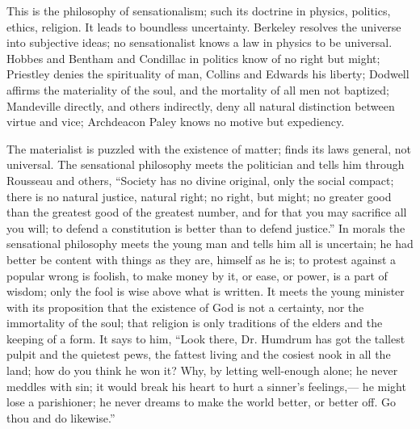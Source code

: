 \documentclass[12pt]{article}
\begin{document}

This is the philosophy of sensationalism; such its doctrine in physics, politics, ethics, religion. It leads to boundless uncertainty. Berkeley resolves the universe into subjective ideas; no sensationalist knows a law in physics to be universal. Hobbes and Bentham and Condillac in politics know of no right but might; Priestley denies the spirituality of man, Collins and Edwards his liberty; Dodwell affirms the materiality of the soul, and the mortality of all men not baptized; Mandeville directly, and others indirectly, deny all natural distinction between virtue and vice; Archdeacon Paley knows no motive but expediency. 

The materialist is puzzled with the existence of matter; finds its laws general, not universal. The sensational philosophy meets the politician and tells him through Rousseau and others, ``Society has no divine original, only the social compact; there is no natural justice, natural right; no right, but might; no greater good than the greatest good of the greatest number, and for that you may sacrifice all you will; to defend a constitution is better than to defend justice.'' In morals the sensational philosophy meets the young man and tells him all is uncertain; he had better be content with things as they are, himself as he is; to protest against a popular wrong is foolish, to make money by it, or ease, or power, is a part of wisdom; only the fool is wise above what is written. It meets the young minister with its proposition that the existence of God is not a certainty, nor the immortality of the soul; that religion is only traditions of the elders and the keeping of a form. It says to him, ``Look there, Dr. Humdrum has got the tallest pulpit and the quietest pews, the fattest living and the cosiest nook in all the land; how do you think he won it? Why, by letting well-enough alone; he never meddles with sin; it would break his heart to hurt a sinner's feelings,--- he might lose a parishioner; he never dreams to make the world better, or better off. Go thou and do likewise.'' 
\end{document}
